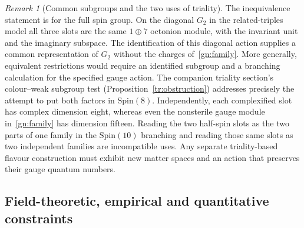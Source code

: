 \documentclass[aps,pra,onecolumn,superscriptaddress,nofootinbib,10pt]{revtex4-2}
\theoremstyle{definition}
\theoremstyle{remark}
\newtheorem{remark}[theorem]{Remark}
\begin{document}
\begin{remark}[Common subgroups and the two uses of triality]\label{gn:restriction}
The inequivalence statement is for the full spin group. On the
diagonal $G_2$ in the related-triples model all three slots are the
same $1\oplus7$ octonion module, with the invariant unit and the
imaginary subspace. The identification of this diagonal action
supplies a common representation of $G_2$ without the charges
of~\eqref{gn:family}. More generally, equivalent restrictions
would require an identified subgroup and a branching calculation
for the specified gauge action. The companion triality section's
colour--weak subgroup test
(Proposition~\ref{tr:obstruction})
addresses precisely the attempt to put both factors in $\mathrm{Spin}(8)$.
Independently, each complexified slot has complex dimension eight,
whereas even the nonsterile gauge module in~\eqref{gn:family}
has dimension fifteen. Reading the two half-spin slots as the
two parts of one family in the $\mathrm{Spin}(10)$ branching
and reading those same slots as two independent families
are incompatible uses. Any separate triality-based flavour
construction must exhibit new matter spaces and an action
that preserves their gauge quantum numbers.
\end{remark}

\subsection{Field-theoretic, empirical and quantitative constraints}\label{gn:constraints}
\end{document}

